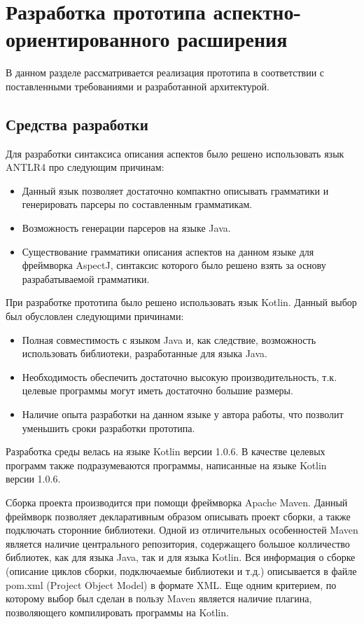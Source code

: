 \chapter{Разработка прототипа аспектно-ориентированного расширения}
В данном разделе рассматривается реализация прототипа в соответствии с
поставленными требованиями и разработанной архитектурой.
\section{Средства разработки}
\label{sec:dev_tools}
Для разработки синтаксиса описания аспектов было решено использовать язык ANTLR4
про следующим причинам:
\begin{itemize}
	\item Данный язык позволяет достаточно компактно описывать грамматики и
		  генерировать парсеры по составленным грамматикам.
	\item Возможность генерации парсеров на языке Java.
	\item Существование грамматики описания аспектов на данном языке для
		  фреймворка AspectJ, синтаксис которого было решено взять за основу
		  разрабатываемой грамматики.
\end{itemize}

При разработке прототипа было решено использовать язык Kotlin.
Данный выбор был обусловлен следующими причинами:
\begin{itemize}
	\item Полная совместимость с языком Java и, как следствие, возможность
		  использовать библиотеки, разработанные для языка Java.
	\item Необходимость обеспечить достаточно высокую производительность, т.к.
		  целевые программы могут иметь достаточно большие размеры.
	\item Наличие опыта разработки на данном языке у автора работы, что
		  позволит уменьшить сроки разработки прототипа.
\end{itemize}
Разработка среды велась на языке Kotlin версии 1.0.6.
В качестве целевых программ также подразумеваются программы, написанные на языке Kotlin версии 1.0.6.

Сборка проекта производится при помощи фреймворка Apache Maven.
Данный фреймворк позволяет декларативным образом описывать проект сборки, а
также подключать сторонние библиотеки.
Одной из отличительных особенностей Maven является наличие центрального
репозитория, содержащего большое колличество библиотек, как для языка Java, так
и для языка Kotlin.
Вся информация о сборке (описание циклов сборки, подключаемые библиотеки и т.д.)
описывается в файле pom.xml (Project Object Model) в формате XML.
Еще одним критерием, по которому выбор был сделан в пользу Maven является наличие плагина, позволяющего компилировать программы на Kotlin.
